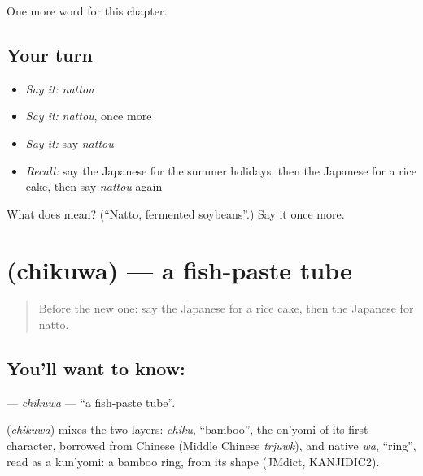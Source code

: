 \begin{grammarlens}[title={What you've built}]
One more word for this chapter.
\end{grammarlens}

\subsection*{Your turn}
\begin{itemize}
\raggedright
  \item \emph{Say it:} \emph{nattou}
  \item \emph{Say it:} \emph{nattou}, once more
  \item \emph{Say it:} say \emph{nattou}
  \item \emph{Recall:} say the Japanese for the summer holidays, then the Japanese for a rice cake, then say \emph{nattou} again
\end{itemize}

\begin{tcolorbox}[breakable,colback=teal!4,colframe=teal!35!black,title={Before you move on}]
What does  mean? (\textquotedblleft{}Natto, fermented soybeans\textquotedblright{}.) Say it once more.
\end{tcolorbox}
\section[\texorpdfstring{\ja{ちくわ} (chikuwa)}{ちくわ (chikuwa)}]{ (chikuwa) — a fish-paste tube}

\label{lesson:JA-C70-chikuwa}



\begin{quote}
Before the new one: say the Japanese for a rice cake, then the Japanese for natto.
\end{quote}

\subsection*{You'll want to know: }
\textbf{} — \emph{chikuwa} — \textquotedblleft{}a fish-paste tube\textquotedblright{}.

\begin{cousinweb}
\textbf{} (\emph{chikuwa}) mixes the two layers: \emph{chiku}, \textquotedblleft{}bamboo\textquotedblright{}, the on'yomi of its first character, borrowed from Chinese (Middle Chinese \emph{trjuwk}), and native \emph{wa}, \textquotedblleft{}ring\textquotedblright{}, read as a kun'yomi: a bamboo ring, from its shape (JMdict, KANJIDIC2).
\end{cousinweb}

